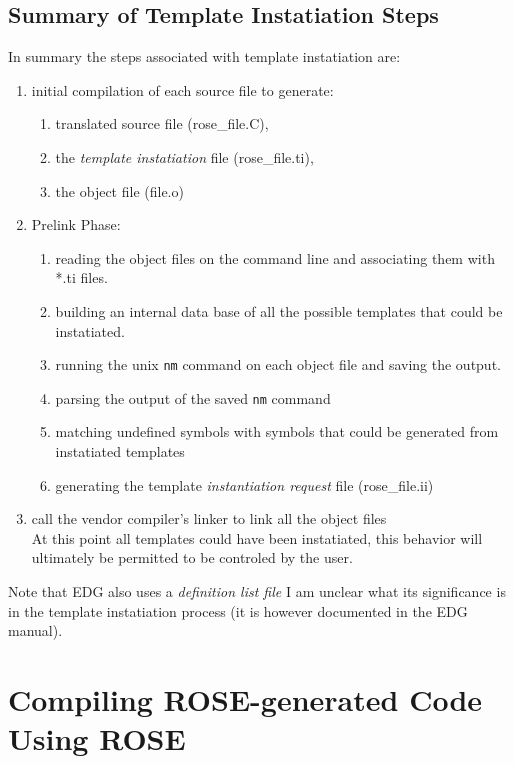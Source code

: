 {\subsection{Summary of Template Instatiation Steps}
   In summary the steps associated with template instatiation are:
\begin{enumerate}
   \item initial compilation of each source file to generate: 
   \begin{enumerate}
      \item translated source file (rose\_file.C),
      \item the {\em template instatiation} file (rose\_file.ti),
      \item the object file (file.o)
   \end{enumerate}
   \item Prelink Phase:
   \begin{enumerate}
      \item reading the object files on the command line and associating them with *.ti files.  
      \item building an internal data base of all the possible templates that could be instatiated.
      \item running the unix {\tt nm} command on each object file and saving the output.
      \item parsing the output of the saved {\tt nm} command
      \item matching undefined symbols with symbols that could be generated from instatiated templates
      \item generating the template {\em instantiation request} file (rose\_file.ii)
   \end{enumerate}
   \item call the vendor compiler's linker to link all the object files \\
         At this point all templates could have been instatiated, this behavior will
         ultimately be permitted to be controled by the user.
\end{enumerate}

Note that EDG also uses a {\em definition list file}  I am unclear what its significance
is in the template instatiation process (it is however documented in the EDG manual).
}


\section{Compiling ROSE-generated Code Using ROSE}

